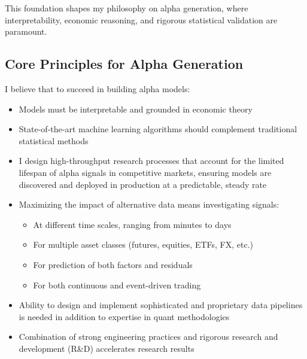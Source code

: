 \documentclass[11pt, letterpaper]{article}
\begin{document}
  This foundation shapes my philosophy on alpha generation, where interpretability,
  economic reasoning, and rigorous statistical validation are paramount.

  \subsection{Core Principles for Alpha Generation}
  \label{core-principles-for-alpha-generation}

  I believe that to succeed in building alpha models:

  \begin{itemize}
    \item Models must be interpretable and grounded in economic theory

    \item State-of-the-art machine learning algorithms should complement
      traditional statistical methods

    \item I design high-throughput research processes that account for the
      limited lifespan of alpha signals in competitive markets, ensuring
      models are discovered and deployed in production at a predictable,
      steady rate

    \item Maximizing the impact of alternative data means investigating signals:

      \begin{itemize}
        \item At different time scales, ranging from minutes to days

        \item For multiple asset classes (futures, equities, ETFs, FX,
          etc.)

        \item For prediction of both factors and residuals

        \item For both continuous and event-driven trading
      \end{itemize}

    \item Ability to design and implement sophisticated and proprietary data
      pipelines is needed in addition to expertise in quant methodologies

    \item Combination of strong engineering practices and rigorous research
      and development (R\&D) accelerates research results
  \end{itemize}
\end{document}
